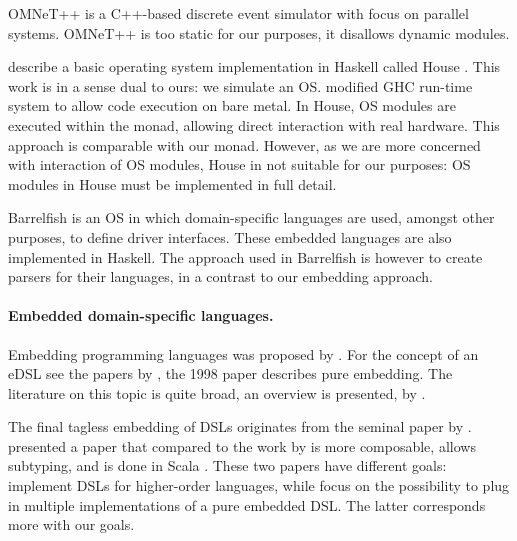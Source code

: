 OMNeT++ \cite{omnet} is a C++-based discrete event simulator with focus on parallel systems. OMNeT++ is too static for our purposes, it disallows dynamic modules.


\citeauthor{house} describe a basic operating system implementation in Haskell called House \cite{house}.
This work is in a sense dual to ours: we simulate an OS.
\citeauthor{house} modified GHC run-time system to allow code execution on bare metal.
In House, OS modules are executed within the  monad, allowing direct interaction with real hardware.
This approach is comparable with our  monad.
However, as we are more concerned with interaction of OS modules, House in not suitable for our purposes:  OS modules in House must be implemented in full detail.

Barrelfish \cite{barrelfish} is an OS in which domain-specific languages are used, amongst other purposes, to define driver interfaces.
These embedded languages are also implemented in Haskell.
The approach used in Barrelfish is however to create parsers for their languages, in a contrast to our embedding approach.


\paragraph{Embedded domain-specific languages.}
Embedding programming languages was proposed by \citeauthor{Landin:1966:NPL:365230.365257} \cite{Landin:1966:NPL:365230.365257}.
For the concept of an eDSL see the papers by \citeauthor{hudak1} \cite{hudak1,hudak2}, the 1998 paper describes pure embedding.
The literature on this topic is quite broad, an overview is presented, \eg by \citeauthor{dsl-survey} \cite{dsl-survey}.

The final tagless embedding of DSLs originates from the seminal paper by \citeauthor{final_tagless_embedding} \cite{final_tagless_embedding}.
\citeauthor{Hofer:2008:PED:1449913.1449935} \cite{Hofer:2008:PED:1449913.1449935} presented a paper that compared to the work by \citeauthor{final_tagless_embedding} \cite{final_tagless_embedding} is more composable, allows subtyping, and is done in Scala \cite{odersky2008programming}.
These two papers have different goals: \citeauthor{final_tagless_embedding} implement DSLs for higher-order languages, while \citeauthor{Hofer:2008:PED:1449913.1449935} focus on the possibility to plug in multiple implementations of a pure embedded DSL.
The latter corresponds more with our goals.

